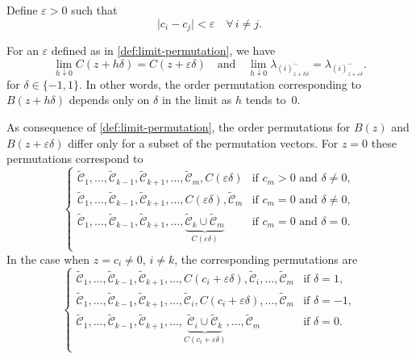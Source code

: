 \begin{definition}
  \label{def:limit-permutation}
  Define \(\varepsilon > 0\) such that
  \begin{equation*}
    \big| c_i - c_j\big| < \varepsilon \quad \forall\, i \neq j.
  \end{equation*}
\end{definition}

For an \(\varepsilon\) defined as in \cref{def:limit-permutation}, we have
\begin{equation}
  \lim_{h \downarrow 0} C(z + h\delta) = C(z + \varepsilon \delta)
  \quad\text{and}\quad
  \lim_{h \downarrow 0} \lambda_{(i)^-_{z + h\delta}}
  = \lambda_{(i)^-_{z + \varepsilon\delta}}.
\end{equation}
for \(\delta \in \{-1, 1\}\).
In other words, the order permutation corresponding to \(B(z + h\delta)\) depends only on
\(\delta\) in the limit as \(h\) tends to~\(0\).

\begin{remark}
  As consequence of \cref{def:limit-permutation}, the order
  permutations for \(B(z)\) and \(B(z + \varepsilon \delta)\) differ only for a subset of
  the permutation vectors. For \(z = 0\)
  these permutations correspond to
  \[
    \begin{cases}
      \tilde{\mathcal{C}}_1, \dots, \tilde{\mathcal{C}}_{k-1}, \tilde{\mathcal{C}}_{k+1}, \dots, \tilde{\mathcal{C}}_m, C(\varepsilon\delta)                                          & \text{if } c_m > 0 \text{ and } \delta \neq 0, \\
      \tilde{\mathcal{C}}_1, \dots, \tilde{\mathcal{C}}_{k-1}, \tilde{\mathcal{C}}_{k+1}, \dots, C(\varepsilon\delta), \tilde{\mathcal{C}}_m                                          & \text{if } c_m = 0 \text{ and } \delta \neq 0, \\
      \tilde{\mathcal{C}}_1, \dots, \tilde{\mathcal{C}}_{k-1}, \tilde{\mathcal{C}}_{k+1}, \dots, \underbrace{\tilde{\mathcal{C}}_k \cup \tilde{\mathcal{C}}_m}_{C(\varepsilon\delta)} & \text{if } c_m = 0 \text{ and } \delta = 0.    \\
    \end{cases}
  \]
  In the case when \(z = c_i \neq 0\), \(i \neq k\), the corresponding permutations are
  \[
    \begin{cases}
      \tilde{\mathcal{C}}_1, \dots, \tilde{\mathcal{C}}_{k-1}, \tilde{\mathcal{C}}_{k+1}, \dots, C(c_i + \varepsilon\delta), \tilde{\mathcal{C}}_i, \dots, \tilde{\mathcal{C}}_m                                          & \text{if } \delta = 1,  \\
      \tilde{\mathcal{C}}_1, \dots, \tilde{\mathcal{C}}_{k-1}, \tilde{\mathcal{C}}_{k+1}, \dots, \tilde{\mathcal{C}}_i, C(c_i + \varepsilon\delta), \dots, \tilde{\mathcal{C}}_m                                          & \text{if } \delta = -1, \\
      \tilde{\mathcal{C}}_1, \dots, \tilde{\mathcal{C}}_{k-1}, \tilde{\mathcal{C}}_{k+1}, \dots, \underbrace{\tilde{\mathcal{C}}_i \cup \tilde{\mathcal{C}}_k}_{C(c_i + \varepsilon\delta)}, \dots, \tilde{\mathcal{C}}_m & \text{if } \delta = 0.  \\
    \end{cases}
  \]
\end{remark}


